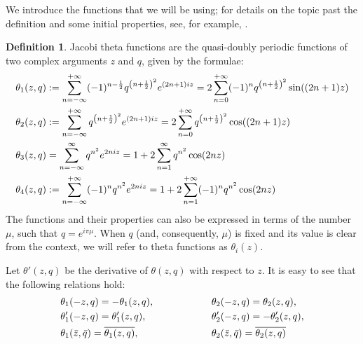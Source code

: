 \documentclass[11pt,twoside]{article}
\theoremstyle{definition}
\newtheorem{Def}[theorem]{Definition}
\numberwithin{equation}{section}
\begin{document}
 We introduce the functions that we will be using; for details on the topic past the definition and some initial properties, see, for example, \cite{whittaker2020course, bellman2013brief}. 


\begin{Def}
\label{def: theta functions}
Jacobi theta functions are the quasi-doubly periodic functions of two complex arguments $z$ and $q$, given by the formulae:
\begin{equation}
    \begin{split}
    &\theta_1(z,q):=\sum\limits_{n=-\infty}^{+\infty}(-1)^{n-\frac{1}{2}}q^{\left(n+\frac{1}{2}\right)^2}e^{(2n+1)iz} = 2\sum\limits_{n=0}^{+\infty}(-1)^{n}q^{\left(n+\frac{1}{2}\right)^2}\sin((2n+1)z)\\
        &\theta_2(z,q):=\sum\limits_{n=-\infty}^{+\infty}q^{\left(n+\frac{1}{2}\right)^2}e^{(2n+1)iz} = 2\sum\limits_{n=0}^{+\infty}q^{\left(n+\frac{1}{2}\right)^2}\cos((2n+1)z)\\
      &\textcolor{black}{\theta_3(z,q) = \sum\limits_{n=-\infty}^{\infty}q^{n^2}e^{2 n  i z} = 1 +2\sum\limits_{n=1}^{\infty}q^{n^2}\cos(2 nz)}\\
        &\theta_4(z,q):=\sum\limits_{n=-\infty}^{+\infty}(-1)^{n}q^{n^2}e^{2niz} = 1+2\sum\limits_{n=1}^{+\infty}(-1)^{n}q^{n^2}\cos(2nz)
    \end{split}
\end{equation}
The functions and their properties can also be expressed in  terms of the number $\mu$, such that  $q = e^{i\pi\mu}$. When $q$ (and, consequently, $\mu$)  is fixed and its value is clear from the context, we will refer to theta functions as $\theta_i(z)$. 
\end{Def}
 Let $\theta'(z,q)$ be the derivative of $\theta(z,q)$ with respect to $z$. It is easy to see that the following relations hold: 
\begin{equation}
\centering
 \label{eq: Jac th element props}
\begin{split}
     &\theta_{1}(-z,q) = -\theta_{1}(z,q),  \\
     &\theta'_{1}(-z,q) = \theta'_{1}(z,q),\\
  & \theta_{1}(\bar{z},\bar{q}) = \overline{\theta_{1}(z,q)},
  \end{split}\ \ \  \ \ \ \ \ \ \ \ \ \ \ \ \ \ \ 
  \begin{split}
&\theta_{2}(-z,q) = \theta_{2}(z,q),\\
&\theta'_{2}(-z,q) = -\theta'_{2}(z,q),\\
&\theta_{2}(\bar{z},\bar{q}) = \overline{\theta_{2}(z,q)}
\end{split}
 \end{equation}
\end{document}
